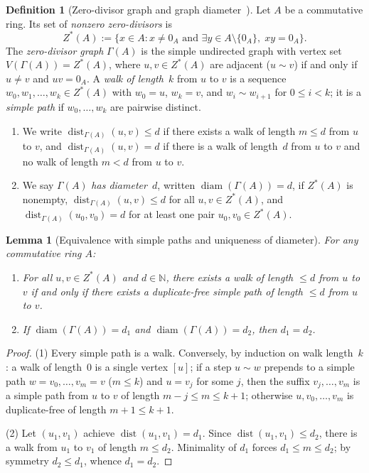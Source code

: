 \documentclass[11pt]{article}
\newtheorem{lemma}[theorem]{Lemma}
\theoremstyle{definition}
\newtheorem{definition}[theorem]{Definition}
\newcommand{\diam}{\operatorname{diam}}
\newcommand{\dist}{\operatorname{dist}}
\newcommand{\NN}{\mathbb{N}}
\begin{document}
\begin{definition}[Zero-divisor graph and graph diameter~\cite{AndersonLivingston1999}]\label{def:zdg}
Let $A$ be a commutative ring. Its set of \emph{nonzero zero-divisors} is
\[
  Z^*(A) := \{x \in A : x \neq 0_A \text{ and } \exists y \in A \setminus \{0_A\},\; x y = 0_A\}.
\]
The \emph{zero-divisor graph} $\Gamma(A)$ is the simple undirected graph with vertex set
$V(\Gamma(A)) = Z^*(A)$, where $u, v \in Z^*(A)$ are adjacent ($u \sim v$) if and only if
$u \neq v$ and $u v = 0_A$. A \emph{walk of length~$k$} from $u$ to $v$ is a sequence
$w_0, w_1, \dots, w_k \in Z^*(A)$ with $w_0 = u$, $w_k = v$, and $w_i \sim w_{i+1}$ for
$0 \le i < k$; it is a \emph{simple path} if $w_0, \dots, w_k$ are pairwise distinct.
\begin{enumerate}
  \item We write $\dist_{\Gamma(A)}(u, v) \le d$ if there exists a walk of length
  $m \le d$ from $u$ to $v$, and $\dist_{\Gamma(A)}(u, v) = d$ if there is a walk of
  length~$d$ from $u$ to $v$ and no walk of length $m < d$ from $u$ to $v$.
  \item We say $\Gamma(A)$ \emph{has diameter~$d$}, written $\diam(\Gamma(A)) = d$, if
  $Z^*(A)$ is nonempty, $\dist_{\Gamma(A)}(u, v) \le d$ for all $u, v \in Z^*(A)$, and
  $\dist_{\Gamma(A)}(u_0, v_0) = d$ for at least one pair $u_0, v_0 \in Z^*(A)$.
\end{enumerate}
\end{definition}

\begin{lemma}[Equivalence with simple paths and uniqueness of diameter]\label{lem:walk-path}
For any commutative ring $A$:
\begin{enumerate}
  \item For all $u, v \in Z^*(A)$ and $d \in \NN$, there exists a walk of length $\le d$
  from $u$ to $v$ if and only if there exists a duplicate-free simple path of length
  $\le d$ from $u$ to $v$.
  \item If $\diam(\Gamma(A)) = d_1$ and $\diam(\Gamma(A)) = d_2$, then $d_1 = d_2$.
\end{enumerate}
\end{lemma}
\begin{proof}
(1) Every simple path is a walk. Conversely, by induction on walk length~$k$: a walk of
length~$0$ is a single vertex $[u]$; if a step $u \sim w$ prepends to a simple path
$w = v_0, \dots, v_m = v$ ($m \le k$) and $u = v_j$ for some $j$, then the suffix
$v_j, \dots, v_m$ is a simple path from $u$ to $v$ of length $m - j \le m \le k + 1$;
otherwise $u, v_0, \dots, v_m$ is duplicate-free of length $m + 1 \le k + 1$.

(2) Let $(u_1, v_1)$ achieve $\dist(u_1, v_1) = d_1$. Since $\dist(u_1, v_1) \le d_2$,
there is a walk from $u_1$ to $v_1$ of length $m \le d_2$. Minimality of $d_1$ forces
$d_1 \le m \le d_2$; by symmetry $d_2 \le d_1$, whence $d_1 = d_2$.
\end{proof}
\end{document}
